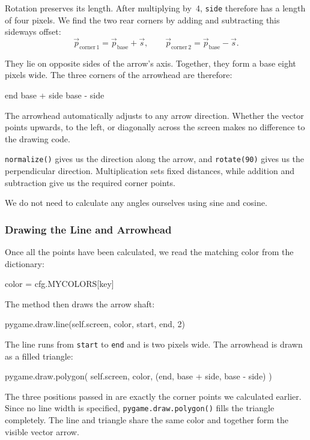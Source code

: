 Rotation preserves its length. After multiplying by~4, \texttt{side} therefore has a length of four pixels. We find the two rear corners by adding and subtracting this sideways offset:
\[
\vec p_{\mathrm{corner\,1}}
=
\vec p_{\mathrm{base}} + \vec s,
\qquad
\vec p_{\mathrm{corner\,2}}
=
\vec p_{\mathrm{base}} - \vec s.
\]

They lie on opposite sides of the arrow's axis. Together, they form a base eight pixels wide. The three corners of the arrowhead are therefore:
\begin{codebox}
end
base + side
base - side
\end{codebox}

\begin{hintbox}
	The arrowhead automatically adjusts to any arrow direction. Whether the vector points upwards, to the left, or diagonally across the screen makes no difference to the drawing code.
	
	\texttt{normalize()} gives us the direction along the arrow, and \texttt{rotate(90)} gives us the perpendicular direction. Multiplication sets fixed distances, while addition and subtraction give us the required corner points.
	
	We do not need to calculate any angles ourselves using sine and cosine.
\end{hintbox}

\subsubsection*{Drawing the Line and Arrowhead}

Once all the points have been calculated, we read the matching color from the dictionary:
\begin{codebox}
	color = cfg.MYCOLORS[key]
\end{codebox}

The method then draws the arrow shaft:
\begin{codebox}
	pygame.draw.line(self.screen, color, start, end, 2)
\end{codebox}

The line runs from \texttt{start} to \texttt{end} and is two pixels wide. The arrowhead is drawn as a filled triangle:
\begin{codebox}
pygame.draw.polygon(
    self.screen,
    color,
    (end, base + side, base - side)
)
\end{codebox}

The three positions passed in are exactly the corner points we calculated earlier. Since no line width is specified, \texttt{pygame.draw.polygon()} fills the triangle completely. The line and triangle share the same color and together form the visible vector arrow.

